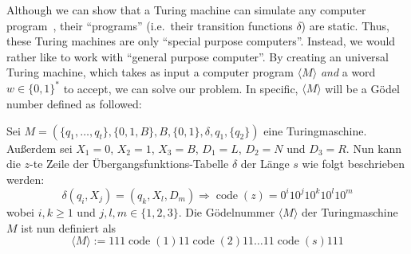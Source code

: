 \documentclass[journal]{IEEEtran}
\begin{document}


Although we can show that a Turing machine can simulate any computer program~\cite{Wegener2013:2.3}, their ``programs'' (i.e.~their transition functions $\delta$) are static. Thus, these Turing machines are only ``special purpose computers''. Instead, we would rather like to work with ``general purpose computer''. By creating an universal Turing machine, which takes as input a computer program $\langle M \rangle$ \textit{and} a word $w \in \{0, 1\}^*$ to accept, we can solve our problem. In specific, $\langle M \rangle$ will be a Gödel number defined as followed:

\begin{definition}[Gödelnummer]
  Sei $M = (\{q_1, \dotsc, q_t\}, \{0, 1, B\}, B, \{0, 1\}, \delta, q_1, \{q_2\})$ eine Turingmaschine. Außerdem sei $X_1 = 0$, $X_2 = 1$, $X_3 = B$, $D_1 = L$, $D_2 = N$ und $D_3 = R$. Nun kann die $z$-te Zeile der Übergangsfunktions-Tabelle $\delta$ der Länge $s$ wie folgt beschrieben werden:
  \begin{equation*}
    \delta(q_i, X_j) = (q_k, X_l, D_m) \Longrightarrow \operatorname{code}(z) = 0^i 10^j 10^k 10^l 10^m
  \end{equation*}
  wobei $i, k \ge 1$ und $j, l, m \in \{1, 2, 3\}$. Die Gödelnummer $\langle M \rangle$ der Turingmaschine $M$ ist nun definiert als
  \begin{equation*}
    \langle M \rangle := 111 \operatorname{code}(1) 11 \operatorname{code}(2) 11 \dotsc 11 \operatorname{code}(s) 111
  \end{equation*}
\end{definition}
\end{document}
